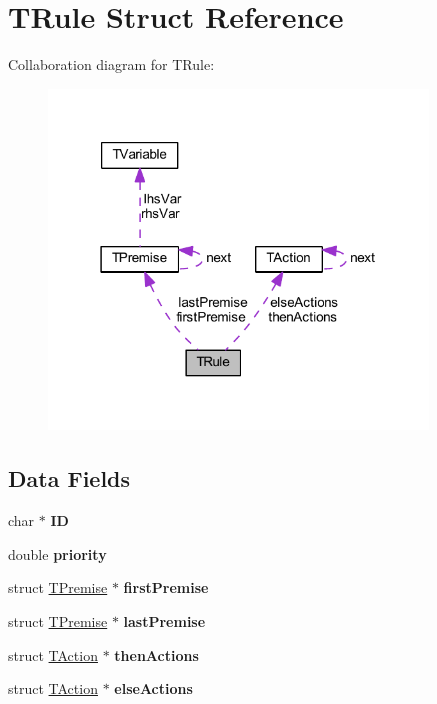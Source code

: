 \hypertarget{struct_t_rule}{}\section{T\+Rule Struct Reference}
\label{struct_t_rule}


Collaboration diagram for T\+Rule\+:
\nopagebreak
\begin{figure}[H]
\begin{center}
\leavevmode
\includegraphics[width=286pt]{d6/d96/struct_t_rule__coll__graph}
\end{center}
\end{figure}
\subsection*{Data Fields}
\begin{DoxyCompactItemize}
\item 
\mbox{\label{struct_t_rule_a63756a4a33a8c806e584babb52907653}} 
char $\ast$ {\bfseries ID}
\item 
\mbox{\label{struct_t_rule_afcf6802c0d69f7f136bf5eac84b2ef63}} 
double {\bfseries priority}
\item 
\mbox{\label{struct_t_rule_a4729083a550cfbe516ec05f13d1b076d}} 
struct \hyperlink{struct_t_premise}{T\+Premise} $\ast$ {\bfseries first\+Premise}
\item 
\mbox{\label{struct_t_rule_a50d7a1dcee0340e3eb4a4c9d1277fe48}} 
struct \hyperlink{struct_t_premise}{T\+Premise} $\ast$ {\bfseries last\+Premise}
\item 
\mbox{\label{struct_t_rule_a1d289f68ff3a8eeb878bf00d85a6eb25}} 
struct \hyperlink{struct_t_action}{T\+Action} $\ast$ {\bfseries then\+Actions}
\item 
\mbox{\label{struct_t_rule_ac48594e66b02a027e8eb878984544179}} 
struct \hyperlink{struct_t_action}{T\+Action} $\ast$ {\bfseries else\+Actions}
\end{DoxyCompactItemize}


